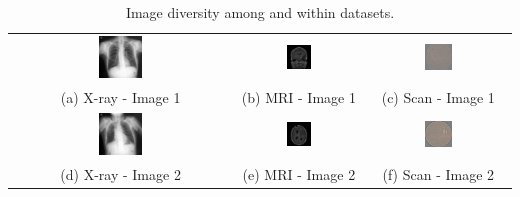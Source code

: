 \begin{table}[ht]
\centering
\begin{tabular}{ccc}
\includegraphics[width=0.2\textwidth]{main/content/images/dataset_comparison/pneumoconiosis/1.jpg} &
\includegraphics[width=0.2\textwidth]{main/content/images/dataset_comparison/brain_tumor/1.jpg} &
\includegraphics[width=0.2\textwidth]{main/content/images/dataset_comparison/retinopatia/1.png} \\
(a) X-ray - Image 1 & (b) MRI - Image 1 & (c) Scan - Image 1 \\
\includegraphics[width=0.2\textwidth]{main/content/images/dataset_comparison/pneumoconiosis/2.jpg} &
\includegraphics[width=0.2\textwidth]{main/content/images/dataset_comparison/brain_tumor/4.jpg} &
\includegraphics[width=0.2\textwidth]{main/content/images/dataset_comparison/retinopatia/2.png} \\
(d) X-ray - Image 2 & (e) MRI - Image 2 & (f) Scan - Image 2 \\
\end{tabular}
\caption{Image diversity among and within datasets.}
\label{tab:image_diversity}
\end{table}